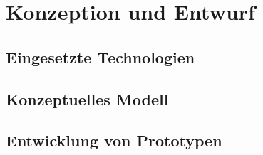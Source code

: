 \chapter{Konzeption und Entwurf}

\section{Eingesetzte Technologien}

\section{Konzeptuelles Modell}

\section{Entwicklung von Prototypen}
